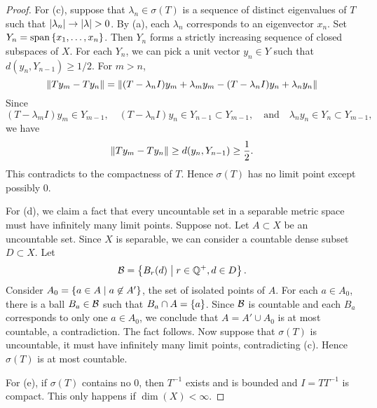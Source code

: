 \begin{proof}
    For (c), suppose that $\lambda_n\in\sigma(T)$ is a sequence of 
    distinct eigenvalues of $T$ such that $\left\lvert {\lambda_n} \right\rvert\to\left\lvert {\lambda} \right\rvert > 0$. 
    By (a), each $\lambda_n$ corresponds to an eigenvector $x_n$. 
    Set $Y_n = \operatorname{span}\left\{ {x_1,\ldots,x_n} \right\}$. Then $Y_n$ forms a 
    strictly increasing sequence of closed subspaces of $X$. 
    For each $Y_n$, we can pick a unit vector $y_n\in Y$ 
    such that $d(y_n, Y_{n-1})\geq 1/2$. For $m>n$,
    \begin{equation*}
        \left\lVert {Ty_m - Ty_n} \right\rVert = \left\lVert {(T-\lambda_n I)y_m + \lambda_my_m - (T-\lambda_n I)y_n + \lambda_ny_n} \right\rVert 
    \end{equation*}
    Since 
    \begin{equation*}
        (T-\lambda_mI)y_m\in Y_{m-1},\quad  
        (T-\lambda_nI)y_n\in Y_{n-1}\subset Y_{m-1},\quad\text{and}\quad 
        \lambda_ny_n\in Y_n\subset Y_{m-1},
    \end{equation*}
    we have
    \begin{equation*}
        \left\lVert {Ty_m - Ty_n} \right\rVert \geq d(y_n, Y_{n-1}) \geq \frac{1}{2}.
    \end{equation*}
    This contradicts to the compactness of $T$. Hence $\sigma(T)$ has 
    no limit point except possibly $0$. 

    For (d), we claim a fact that every uncountable set in a separable 
    metric space must have infinitely many limit points. Suppose not. 
    Let $A\subset X$ be an uncountable set. Since $X$ is separable, 
    we can consider a countable dense subset $D\subset X$. Let 
    \begin{equation*}
        \mathcal{B} = \left\{ B_r(d) \;\middle\vert\; r\in\mathbb{Q}^+, d\in D \right\}. 
    \end{equation*} 
    Consider $A_0 = \left\{ a\in A \;\middle\vert\; a\not\in A' \right\}$, the set of isolated points of $A$.
    For each $a\in A_0$, there is a ball $B_a\in\mathcal{B}$ such that 
    $B_a\cap A = \left\{ {a} \right\}$. Since $\mathcal{B}$ is countable and each $B_a$ corresponds to 
    only one $a\in A_0$, we conclude that $A = A'\cup A_0$ is at most countable, 
    a contradiction. The fact follows. Now suppose that $\sigma(T)$ is 
    uncountable, it must have infinitely many limit points, contradicting 
    (c). Hence $\sigma(T)$ is at most countable.

    For (e), if $\sigma(T)$ contains no $0$, then $T^{-1}$ exists and 
    is bounded and $I = TT^{-1}$ is compact. This only happens if 
    $\dim(X) < \infty$. 
\end{proof}

